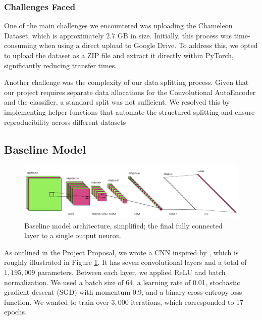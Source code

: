 \documentclass{article} %
\begin{document}
\subsubsection{Challenges Faced}
One of the main challenges we encountered was uploading the Chameleon Dataset, which is approximately 2.7 GB in size. Initially, this process was time-consuming when using a direct upload to Google Drive. To address this, we opted to upload the dataset as a ZIP file and extract it directly within PyTorch, significantly reducing transfer times.

Another challenge was the complexity of our data splitting process. Given that our project requires separate data allocations for the Convolutional AutoEncoder and the classifier, a standard split was not sufficient. We resolved this by implementing helper functions that automate the structured splitting and ensure reproducibility across different datasets

\subsection{Baseline Model}

\begin{figure}[h]
    \begin{center}
        \includegraphics[scale=0.45]{figs/baseline.png}
    \end{center}
    \caption{Baseline model architecture, simplified; the final fully connected layer to a single output neuron.}
    \label{fig:baseline_arch}
\end{figure}

As outlined in the Project Proposal, we wrote a CNN inspired by \citet{wang2020cnngeneratedimagessurprisinglyeasy}, which is roughly illustrated in Figure \ref{fig:baseline_arch}. It has seven convolutional layers and a total of $1,195,009$ parameters. Between each layer, we applied ReLU and batch normalization. We used a batch size of 64, a learning rate of 0.01, stochastic gradient descent (SGD) with momentum 0.9, and a binary cross-entropy loss function. We wanted to train over $3,000$ iterations, which corresponded to 17 epochs.
\end{document}
